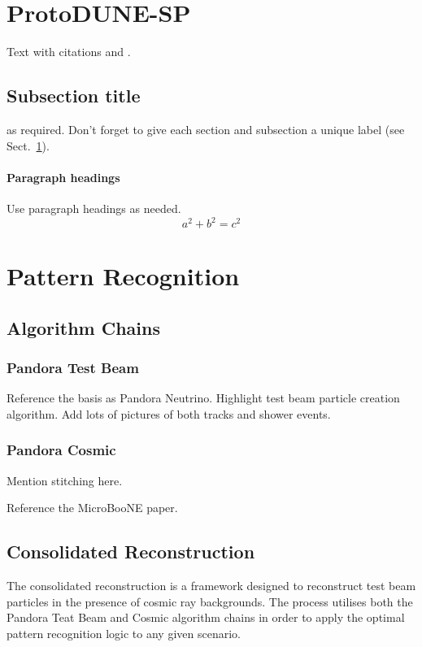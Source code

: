 \section{ProtoDUNE-SP}
\label{sec:1}
Text with citations \cite{RefB} and \cite{RefJ}.
\subsection{Subsection title}
\label{sec:2}
as required. Don't forget to give each section
and subsection a unique label (see Sect.~\ref{sec:1}).
\paragraph{Paragraph headings} Use paragraph headings as needed.
\begin{equation}
a^2+b^2=c^2
\end{equation}

\section{Pattern Recognition}

\subsection{Algorithm Chains}

\subsubsection{Pandora Test Beam}

Reference the basis as Pandora Neutrino.  Highlight test beam particle creation algorithm.  Add lots of pictures of both tracks and shower events.

\subsubsection{Pandora Cosmic}

Mention stitching here. 

Reference the MicroBooNE paper.

\subsection{Consolidated Reconstruction}

The consolidated reconstruction is a framework designed to reconstruct test beam particles in the presence of cosmic ray backgrounds.  The process utilises both the Pandora Teat Beam and Cosmic algorithm chains in order to apply the optimal pattern recognition logic to any given scenario.   

